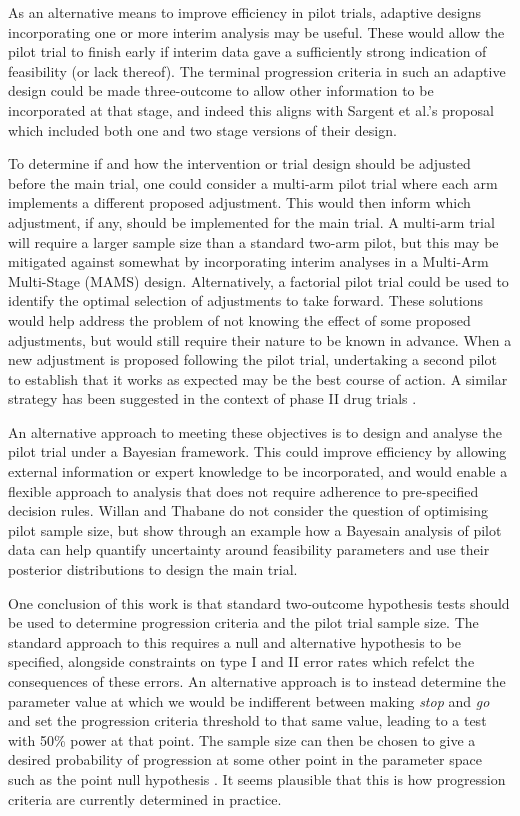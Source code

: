\documentclass[sagev]{sagej}
\begin{document}
As an alternative means to improve efficiency in pilot trials, adaptive designs incorporating one or more interim analysis may be useful. These would allow the pilot trial to finish early if interim data gave a sufficiently strong indication of feasibility (or lack thereof). The terminal progression criteria in such an adaptive design could be made three-outcome to allow other information to be incorporated at that stage, and indeed this aligns with Sargent et al.'s \cite{Sargent2001} proposal which included both one and two stage versions of their design. 

To determine if and how the intervention or trial design should be adjusted before the main trial, one could consider a multi-arm pilot trial where each arm implements a different proposed adjustment. This would then inform which adjustment, if any, should be implemented for the main trial. A multi-arm trial will require a larger sample size than a standard two-arm pilot, but this may be mitigated against somewhat by incorporating interim analyses in a Multi-Arm Multi-Stage (MAMS) design. Alternatively, a factorial pilot trial could be used to identify the optimal selection of adjustments to take forward. These solutions would help address the problem of not knowing the effect of some proposed adjustments, but would still require their nature to be known in advance. When a new adjustment is proposed following the pilot trial, undertaking a second pilot to establish that it works as expected may be the best course of action. A similar strategy has been suggested in the context of phase II drug trials \cite{Brown2012}.

An alternative approach to meeting these objectives is to design and analyse the pilot trial under a Bayesian framework\cite{Hampson2017, Wilson2021}. This could improve efficiency by allowing external information or expert knowledge to be incorporated, and would enable a flexible approach to analysis that does not require adherence to pre-specified decision rules. Willan and Thabane \cite{Willan2020} do not consider the question of optimising pilot sample size, but show through an example how a Bayesain analysis of pilot data can help quantify uncertainty around feasibility parameters and use their posterior distributions to design the main trial. 

One conclusion of this work is that standard two-outcome hypothesis tests should be used to determine progression criteria and the pilot trial sample size. The standard approach to this requires a null and alternative hypothesis to be specified, alongside constraints on type I and II error rates which refelct the consequences of these errors. An alternative approach is to instead determine the parameter value at which we would be indifferent between making \emph{stop} and \emph{go} and set the progression criteria threshold to that same value, leading to a test with 50\% power at that point. The sample size can then be chosen to give a desired probability of progression at some other point in the parameter space such as the point null hypothesis \cite{Willan1994}. It seems plausible that this is how progression criteria are currently determined in practice.
\end{document}
